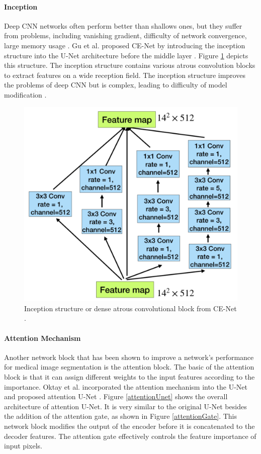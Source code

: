 \documentclass [11pt, proquest] {uwthesis}[2020/02/24]
\begin{document}
\paragraph{Inception}

Deep CNN networks often perform better than shallows ones, but they suffer from 
problems, including vanishing gradient, difficulty of network convergence, large 
memory usage \cite{lei_medical_2020}. Gu et al. proposed CE-Net by introducing 
the inception structure into the U-Net architecture before the middle layer 
\cite{gu_ce-net_2019}. Figure \ref{dac} depicts this structure. The inception 
structure contains various atrous convolution blocks to extract features on a 
wide reception field. The inception structure improves the problems of deep CNN 
but is complex, leading to difficulty of model modification \cite{lei_medical_2020}. 

\begin{figure}
  \centering
  \includegraphics[width=0.6\linewidth]{figures/dense_atrous.png}
  \caption{Inception structure or dense atrous convolutional block from CE-Net \cite{gu_ce-net_2019}.}
  \label{dac}
\end{figure}


\paragraph{Attention Mechanism}

Another network block that has been shown to improve a network’s performance 
for medical image segmentation is the attention block. The basic of the attention 
block is that it can assign different weights to the input features according 
to the importance. Oktay et al. incorporated the attention mechanism into the U-Net 
and proposed attention U-Net \cite{oktay_attention_nodate}. Figure \ref{attentionUnet} 
shows the overall architecture of attention U-Net. It is very similar to the original 
U-Net besides the addition of the attention gate, as shown in Figure \ref{attentionGate}. 
This network block modifies the output of the encoder before it is concatenated 
to the decoder features. The attention gate effectively controls the feature importance 
of input pixels. 
\end{document}
